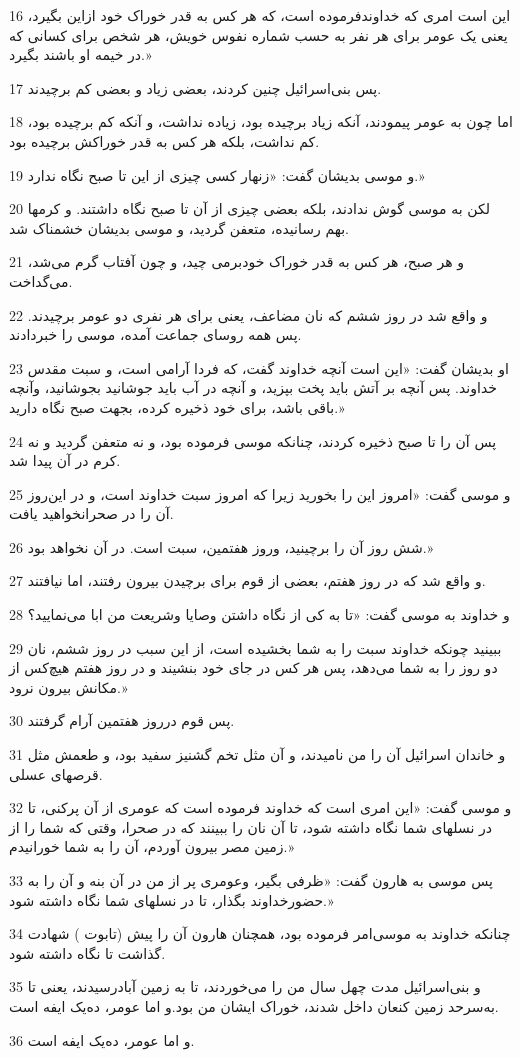 \par 16 این است امری که خداوندفرموده است، که هر کس به قدر خوراک خود ازاین بگیرد، یعنی یک عومر برای هر نفر به حسب شماره نفوس خویش، هر شخص برای کسانی که در خیمه او باشند بگیرد.»
\par 17 پس بنی‌اسرائیل چنین کردند، بعضی زیاد و بعضی کم برچیدند.
\par 18 اما چون به عومر پیمودند، آنکه زیاد برچیده بود، زیاده نداشت، و آنکه کم برچیده بود، کم نداشت، بلکه هر کس به قدر خوراکش برچیده بود.
\par 19 و موسی بدیشان گفت: «زنهار کسی چیزی از این تا صبح نگاه ندارد.»
\par 20 لکن به موسی گوش ندادند، بلکه بعضی چیزی از آن تا صبح نگاه داشتند. و کرمها بهم رسانیده، متعفن گردید، و موسی بدیشان خشمناک شد.
\par 21 و هر صبح، هر کس به قدر خوراک خودبرمی چید، و چون آفتاب گرم می‌شد، می‌گداخت.
\par 22 و واقع شد در روز ششم که نان مضاعف، یعنی برای هر نفری دو عومر برچیدند. پس همه روسای جماعت آمده، موسی را خبردادند.
\par 23 او بدیشان گفت: «این است آنچه خداوند گفت، که فردا آرامی است، و سبت مقدس خداوند. پس آنچه بر آتش باید پخت بپزید، و آنچه در آب باید جوشانید بجوشانید، وآنچه باقی باشد، برای خود ذخیره کرده، بجهت صبح نگاه دارید.»
\par 24 پس آن را تا صبح ذخیره کردند، چنانکه موسی فرموده بود، و نه متعفن گردید و نه کرم در آن پیدا شد.
\par 25 و موسی گفت: «امروز این را بخورید زیرا که امروز سبت خداوند است، و در این‌روز آن را در صحرانخواهید یافت.
\par 26 شش روز آن را برچینید، وروز هفتمین، سبت است. در آن نخواهد بود.»
\par 27 و واقع شد که در روز هفتم، بعضی از قوم برای برچیدن بیرون رفتند، اما نیافتند.
\par 28 و خداوند به موسی گفت: «تا به کی از نگاه داشتن وصایا وشریعت من ابا می‌نمایید؟
\par 29 ببینید چونکه خداوند سبت را به شما بخشیده است، از این سبب در روز ششم، نان دو روز را به شما می‌دهد، پس هر کس در جای خود بنشیند و در روز هفتم هیچ‌کس از مکانش بیرون نرود.»
\par 30 پس قوم درروز هفتمین آرام گرفتند.
\par 31 و خاندان اسرائیل آن را من نامیدند، و آن مثل تخم گشنیز سفید بود، و طعمش مثل قرصهای عسلی.
\par 32 و موسی گفت: «این امری است که خداوند فرموده است که عومری از آن پرکنی، تا در نسلهای شما نگاه داشته شود، تا آن نان را ببینند که در صحرا، وقتی که شما را از زمین مصر بیرون آوردم، آن را به شما خورانیدم.»
\par 33 پس موسی به هارون گفت: «ظرفی بگیر، وعومری پر از من در آن بنه و آن را به حضورخداوند بگذار، تا در نسلهای شما نگاه داشته شود.»
\par 34 چنانکه خداوند به موسی‌امر فرموده بود، همچنان هارون آن را پیش (تابوت ) شهادت گذاشت تا نگاه داشته شود.
\par 35 و بنی‌اسرائیل مدت چهل سال من را می‌خوردند، تا به زمین آبادرسیدند، یعنی تا به‌سرحد زمین کنعان داخل شدند، خوراک ایشان من بود.و اما عومر، ده‌یک ایفه است.
\par 36 و اما عومر، ده‌یک ایفه است.
 
